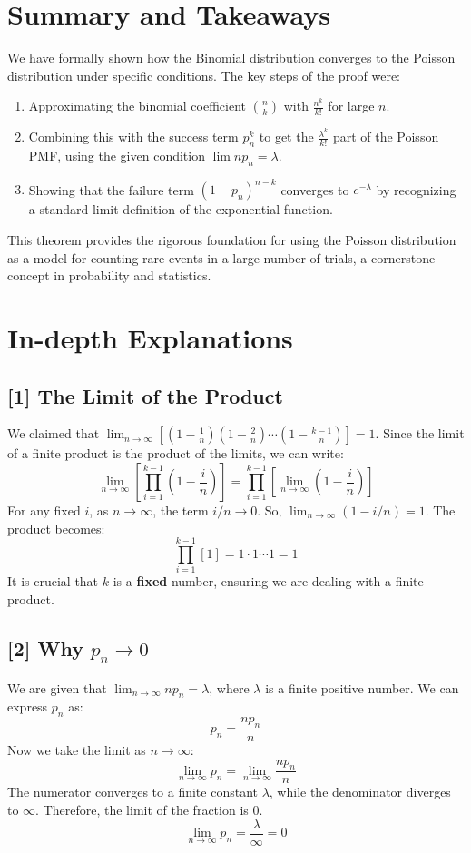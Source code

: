 \documentclass[11pt,a4paper]{article}
\begin{document}
\section{Summary and Takeaways}
We have formally shown how the Binomial distribution converges to the Poisson distribution under specific conditions. The key steps of the proof were:
\begin{enumerate}
    \item Approximating the binomial coefficient $\binom{n}{k}$ with $\frac{n^k}{k!}$ for large $n$.
    \item Combining this with the success term $p_n^k$ to get the $\frac{\lambda^k}{k!}$ part of the Poisson PMF, using the given condition $\lim np_n = \lambda$.
    \item Showing that the failure term $(1-p_n)^{n-k}$ converges to $e^{-\lambda}$ by recognizing a standard limit definition of the exponential function.
\end{enumerate}
This theorem provides the rigorous foundation for using the Poisson distribution as a model for counting rare events in a large number of trials, a cornerstone concept in probability and statistics.

\newpage
\section{In-depth Explanations}

\subsection*{[1] The Limit of the Product}
\label{note:product_limit}
We claimed that $\lim_{n \to \infty} \left[ \left(1-\frac{1}{n}\right) \left(1-\frac{2}{n}\right) \cdots \left(1-\frac{k-1}{n}\right) \right] = 1$.
Since the limit of a finite product is the product of the limits, we can write:
\[
\lim_{n \to \infty} \left[ \prod_{i=1}^{k-1} \left(1-\frac{i}{n}\right) \right] = \prod_{i=1}^{k-1} \left[ \lim_{n \to \infty} \left(1-\frac{i}{n}\right) \right]
\]
For any fixed $i$, as $n \to \infty$, the term $i/n \to 0$. So, $\lim_{n \to \infty} (1 - i/n) = 1$.
The product becomes:
\[
\prod_{i=1}^{k-1} [1] = 1 \cdot 1 \cdots 1 = 1
\]
It is crucial that $k$ is a \textbf{fixed} number, ensuring we are dealing with a finite product.

\subsection*{[2] Why $p_n \to 0$}
\label{note:pn_to_zero}
We are given that $\lim_{n \to \infty} n p_n = \lambda$, where $\lambda$ is a finite positive number. We can express $p_n$ as:
\[
p_n = \frac{n p_n}{n}
\]
Now we take the limit as $n \to \infty$:
\[
\lim_{n \to \infty} p_n = \lim_{n \to \infty} \frac{n p_n}{n}
\]
The numerator converges to a finite constant $\lambda$, while the denominator diverges to $\infty$. Therefore, the limit of the fraction is 0.
\[
\lim_{n \to \infty} p_n = \frac{\lambda}{\infty} = 0
\]
\end{document}
